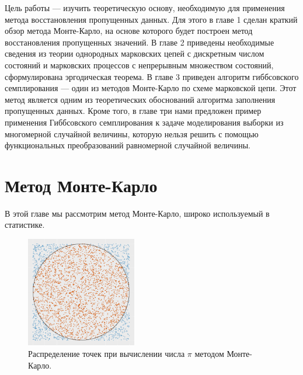 \documentclass[14pt,a4paper]{article}
\begin{document}
Цель работы --- изучить теоретическую основу, необходимую для применения метода восстановления пропущенных данных. Для этого в главе 1 сделан краткий обзор метода Монте-Карло, на основе которого будет построен метод восстановления пропущенных значений. В главе 2 приведены необходимые сведения из теории однородных марковских цепей с дискретным числом состояний и марковских процессов с непрерывным множеством состояний, сформулирована эргодическая теорема. В главе 3 приведен алгоритм гиббсовского семплирования \cite{Murphy} --- один из методов Монте-Карло по схеме марковской цепи. Этот метод является одним из теоретических обоснований алгоритма заполнения пропущенных данных. Кроме того, в главе три нами предложен пример применения Гиббсовского семплирования к задаче моделирования выборки из многомерной случайной величины, которую нельзя решить с помощью функциональных преобразований равномерной случайной величины.


   
	\newpage
   \section{Метод Монте-Карло}
 
В этой главе мы рассмотрим метод Монте-Карло, широко используемый в статистике. 
\begin{figure}
		\centering
	\includegraphics[width=0.43\textwidth]{imgs/Rplot07.pdf}
		\caption{Распределение точек при вычислении числа $\pi$ методом Монте-Карло.}
\end{figure} 
\vspace*{3.5em plus .6em minus .5em}
\end{document}
